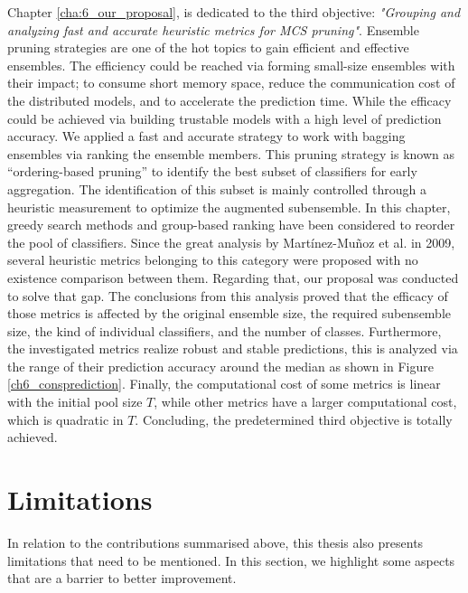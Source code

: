 Chapter \ref{cha:6_our_proposal}, is dedicated to the third objective: \textit{"Grouping and analyzing fast and accurate heuristic metrics for MCS pruning"}. Ensemble pruning strategies are one of the hot topics to gain efficient and effective ensembles. The efficiency could be reached via forming small-size ensembles with their impact; to consume short memory space, reduce the communication cost of the distributed models, and to accelerate the prediction time. While the efficacy could be achieved via building trustable models with a high level of prediction accuracy. We applied a fast and accurate strategy to work with bagging ensembles via ranking the ensemble members. This pruning strategy is known as “ordering-based pruning” to identify the best subset of classifiers for early aggregation. The identification of this subset is mainly controlled through a heuristic measurement to optimize the augmented subensemble. In this chapter, greedy search methods and group-based ranking have been considered to reorder the pool of classifiers. Since the great analysis by Martínez-Muñoz et al. \cite{martinez2009} in 2009, several heuristic metrics belonging to this category were proposed \cite{lu2010,guo2013,guo2018,cao2018} with no existence comparison between them. Regarding that, our proposal was conducted to solve that gap. The conclusions from this analysis proved that the efficacy of those metrics is affected by the original ensemble size, the required subensemble size, the kind of individual classifiers, and the number of classes. Furthermore, the investigated metrics realize robust and stable predictions, this is analyzed via the range of their prediction accuracy around the median as shown in Figure \ref{ch6_consprediction}. Finally, the computational cost of some metrics is linear with the initial pool size $T$, while other metrics have a larger computational cost, which is quadratic in $T$. Concluding, the predetermined third objective is totally achieved.   

\section{Limitations} \label{ch7:limitations}

In relation to the contributions summarised above, this thesis also presents limitations
that need to be mentioned. In this section, we highlight some aspects that are a barrier to better improvement. 

